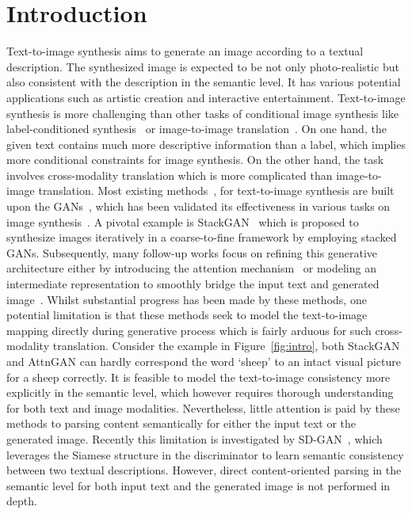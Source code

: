 \documentclass[runningheads]{llncs}
\begin{document}
\section{Introduction}
Text-to-image synthesis aims to generate an image according to a textual description. The synthesized image is expected to be not only photo-realistic but also consistent with the description in the semantic level. It has various potential applications such as artistic creation and interactive entertainment. Text-to-image synthesis is more challenging than other tasks of conditional image synthesis like label-conditioned synthesis~\cite{odena2016conditional} or image-to-image translation~\cite{isola2017image}. On one hand, the given text contains much more descriptive information than a label, which implies more conditional constraints for image synthesis.
On the other hand, the task involves cross-modality translation which is more complicated than image-to-image translation. Most existing methods~\cite{cha2017adversarial,Hao2017Semantic,hinz2019semantic,hong2018inferring,li2019object,qiao2019mirrorgan,reed2016generative,Hong2019semantics-enhanced-augmented,xu2018attngan,yin2019semantics,zhang2017stackgan,Han2017StackGAN,zhu2019dm-gan:}, for text-to-image synthesis are built upon the GANs~\cite{Goodfellow2014Generative}, which has been validated its effectiveness in various tasks on image synthesis~\cite{Brock2018Large,miyato2018spectral,zhang2018self}. A pivotal example is StackGAN~\cite{zhang2017stackgan} which is proposed to synthesize images iteratively in a coarse-to-fine framework by employing stacked GANs. Subsequently, many follow-up works focus on refining this generative architecture either by introducing the attention mechanism~\cite{xu2018attngan,zhu2019dm-gan:} or modeling an intermediate representation to smoothly bridge the input text and generated image~\cite{hinz2019semantic,hong2018inferring,li2019object}. Whilst substantial progress has been made by these methods, one potential limitation is that these methods seek to model the text-to-image mapping directly during generative process which is fairly arduous for such cross-modality translation. Consider the example in Figure~\ref{fig:intro}, both StackGAN and AttnGAN can hardly correspond the word `sheep' to an intact visual picture for a sheep correctly. It is feasible to model the text-to-image consistency more explicitly in the semantic level, which however requires thorough understanding for both text and image modalities. Nevertheless, little attention is paid by these methods to parsing content semantically for either the input text or the generated image. 
Recently this limitation is investigated by SD-GAN~\cite{yin2019semantics}, which leverages the Siamese structure in the discriminator to learn semantic consistency between two textual descriptions.
However, direct content-oriented parsing in the semantic level for both input text and the generated image is not performed in depth.
\end{document}
